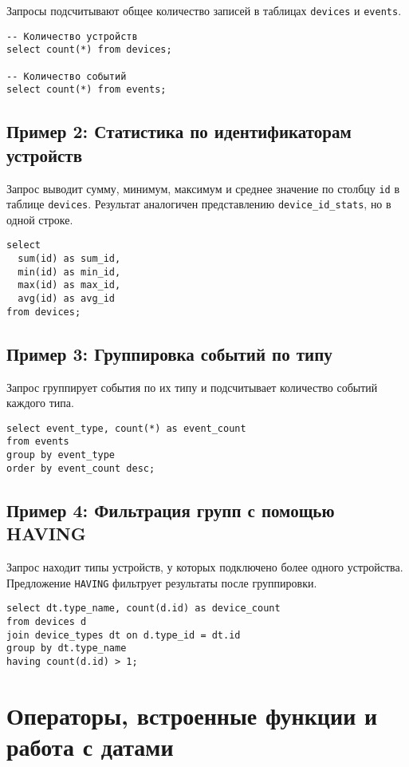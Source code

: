 \documentclass[oneside,a4paper,14pt]{extarticle}
\begin{document}
Запросы подсчитывают общее количество записей в таблицах \texttt{devices} и \texttt{events}.

\begin{verbatim}
-- Количество устройств
select count(*) from devices;

-- Количество событий
select count(*) from events;
\end{verbatim}

\subsection*{Пример 2: Статистика по идентификаторам устройств}

Запрос выводит сумму, минимум, максимум и среднее значение по столбцу \texttt{id} в таблице \texttt{devices}. Результат аналогичен представлению \texttt{device\_id\_stats}, но в одной строке.

\begin{verbatim}
select 
  sum(id) as sum_id,
  min(id) as min_id, 
  max(id) as max_id, 
  avg(id) as avg_id
from devices;
\end{verbatim}

\subsection*{Пример 3: Группировка событий по типу}

Запрос группирует события по их типу и подсчитывает количество событий каждого типа.

\begin{verbatim}
select event_type, count(*) as event_count
from events
group by event_type
order by event_count desc;
\end{verbatim}

\subsection*{Пример 4: Фильтрация групп с помощью HAVING}

Запрос находит типы устройств, у которых подключено более одного устройства. Предложение \texttt{HAVING} фильтрует результаты после группировки.

\begin{verbatim}
select dt.type_name, count(d.id) as device_count
from devices d
join device_types dt on d.type_id = dt.id
group by dt.type_name
having count(d.id) > 1;
\end{verbatim}

\clearpage
\section*{Операторы, встроенные функции и работа с датами}
\end{document}

